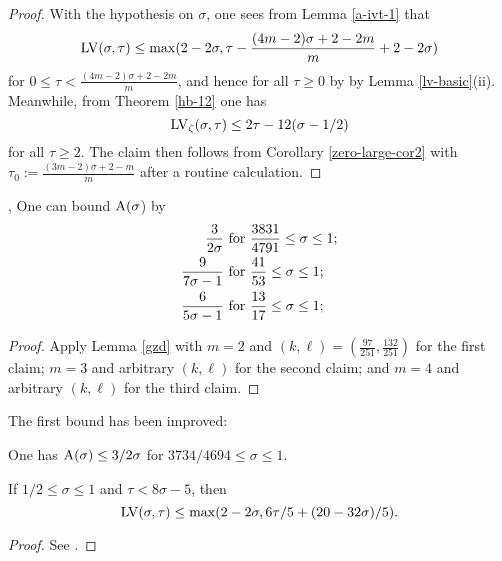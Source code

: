 \begin{proof} With the hypothesis on $\sigma$, one sees from Lemma \ref{a-ivt-1} that
$$ \mathrm{LV}(\sigma,\tau) \leq \max( 2 - 2 \sigma, \tau - \frac{(4m-2)\sigma + 2-2m}{m} + 2-2\sigma)$$
for $0 \leq \tau < \frac{(4m-2)\sigma + 2-2m}{m}$, and hence for all $\tau \geq 0$ by by Lemma \ref{lv-basic}(ii).  Meanwhile, from Theorem \ref{hb-12} one has
$$\mathrm{LV}_\zeta(\sigma,\tau) \leq 2\tau - 12 (\sigma-1/2)$$
for all $\tau \geq 2$.  The claim then follows from Corollary
\ref{zero-large-cor2} with $\tau_0 := \frac{(3m-2)\sigma+2-m}{m}$ after a routine calculation.
\end{proof}

\begin{corollary}\label{further_ivic_zero}\cite{ivic_exponent_1980}, \cite[Theorem 11.4]{ivic} One can bound $\mathrm{A}(\sigma$) by
\begin{align*}
 \frac{3}{2\sigma} &\hbox{ for } \frac{3831}{4791} \leq \sigma \leq 1;\\
 \frac{9}{7\sigma-1} &\hbox{ for } \frac{41}{53} \leq \sigma \leq 1; \\
 \frac{6}{5\sigma-1} &\hbox{ for } \frac{13}{17} \leq \sigma \leq 1;
\end{align*}
\end{corollary}

\begin{proof}  Apply Lemma \ref{gzd} with $m=2$ and $(k,\ell) = (\frac{97}{251}, \frac{132}{251})$ for the first claim; $m=3$ and arbitrary $(k,\ell)$ for the second claim; and $m=4$ and arbitrary $(k,\ell)$ for the third claim.
\end{proof}

The first bound has been improved:

\begin{theorem}\label{bourgain-zero-density-2000}\cite{bourgain_dirichlet_2000} One has $\mathrm{A}(\sigma) \leq 3/2\sigma$ for $3734/4694 \leq \sigma \leq 1$.
\end{theorem}

\begin{lemma}\label{a-ivt}  If $1/2 \leq \sigma \leq 1$ and $\tau < 8\sigma-5$, then
    $$ \mathrm{LV}(\sigma,\tau) \leq \max( 2-2\sigma, 6\tau/5 + (20-32\sigma)/5 ).$$
\end{lemma}

\begin{proof} See \cite[(11.95)]{ivic}.
\end{proof}

